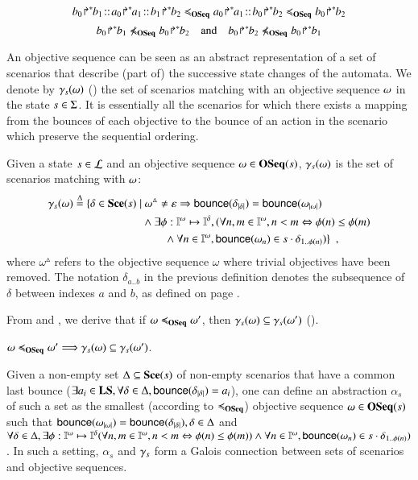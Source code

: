 \begin{example}
\[\obj{b_0}{b_1}\concat\obj{a_0}{a_1}\concat\obj{b_1}{b_2}
\ltw
\obj{a_0}{a_1}\concat\obj{b_0}{b_2}
\ltw
\obj{b_0}{b_2}\]
\[\obj{b_0}{b_1}\not\ltw\obj{b_0}{b_2}
\quad\text{and}\quad
\obj{b_0}{b_2}\not\ltw\obj{b_0}{b_1}\]
\end{example}

An objective sequence can be seen as an abstract representation of a set of scenarios that describe
(part of) the successive state changes of the automata.
We denote by $\gamma_s(\omega)$ () the set of scenarios matching with an objective sequence
$\omega$ in the state $s\in\Sigma$.
It is essentially all the scenarios for which there exists a mapping from the bounces of each
objective to the bounce of an action in the scenario which preserve the sequential ordering.

\begin{definition}[$\concr: \OS \to \powerset(\Sce)$]\label{def:concr}
Given a state $s\in\mathcal{L}$ and an objective sequence
$\omega\in\mathbf{OSeq}(s)$, $\gamma_s(\omega)$ is the set of scenarios matching with $\omega$:
\begin{align*}
\concr(\w) \DEF \{ \delta\in\Sce(s)\mid &\ 
\w^\vartriangle\neq \emptyseq\Rightarrow
\bounce{\delta_{\card\delta}} = \bounce{\w_{\card\w}}
\\ &
 \wedge \exists \phi:\indexes{\w}\mapsto\indexes{\delta},
    (\forall n,m\in\indexes{\w}, n<m \Leftrightarrow \phi(n)\leq\phi(m)
\\ & \qquad
	\wedge \forall n\in\indexes{\w},
	  \bounce{\w_n} \in s\play\delta_{1..\phi(n)})
\}
\enspace,
\end{align*}
where $\omega^\vartriangle$ refers to the objective sequence $\omega$ where
trivial objectives have been removed.
The notation $\delta_{a..b}$ in the previous definition
denotes the subsequence of $\delta$ between indexes $a$ and $b$,
as defined on page \pageref{notations}.
\end{definition}

From  and , we derive that if 
$\omega \preccurlyeq_{\mathbf{OSeq}} \omega'$, then $\gamma_s(\omega)\subseteq\gamma_s(\omega')$ ().
\begin{lemma}\label{lem:ltw}
$\omega\preccurlyeq_{\mathbf{OSeq}}\omega' \Longrightarrow \gamma_s(\omega)\subseteq\gamma_s(\omega')$\enspace.
\end{lemma}

Given a non-empty set $\Delta\subseteq\mathbf{Sce}(s)$ of non-empty scenarios that have a common last bounce
($\exists a_i\in\mathbf{LS}, \forall\delta\in\Delta,
\mathsf{bounce}(\delta_{|\delta|})=a_i$), one can define an abstraction $\alpha_s$ of
such a set as the smallest (according to $\preccurlyeq_{\mathbf{OSeq}}$) objective sequence $\omega\in\mathbf{OSeq}(s)$ such that
$\mathsf{bounce}(\omega_{|\omega|}) = \mathsf{bounce}(\delta_{|\delta|}), \delta\in\Delta$
and
$\forall\delta\in\Delta, \exists \phi:\mathbb{I}^{\omega}\mapsto\mathbb{I}^{\delta}
    (\forall n,m\in\mathbb{I}^{\omega}, n<m \Leftrightarrow \phi(n)\leq\phi(m))
	\wedge \forall n\in\mathbb{I}^{\omega},
	  \mathsf{bounce}(\omega_n) \in s\cdot\delta_{1..\phi(n)})$.
In such a setting, $\alpha_s$ and $\gamma_s$ form a Galois connection between sets
of scenarios and objective sequences.


